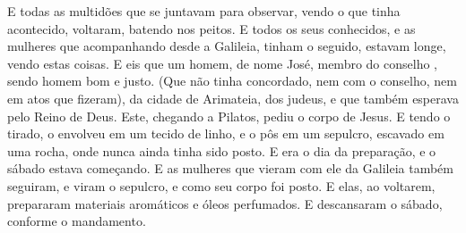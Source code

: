{  E todas as multidões que se juntavam para observar, vendo o que tinha acontecido, voltaram, batendo nos peitos.
  E todos os seus conhecidos, e as mulheres que acompanhando
{} desde a Galileia, tinham o seguido, estavam longe, vendo estas coisas.
  E eis que um homem, de nome José, membro do conselho
{}, sendo homem bom e justo.
  (Que não tinha concordado, nem com o conselho, nem em atos que fizeram), da cidade de Arimateia,
{} dos judeus, e que também esperava pelo Reino de Deus.
  Este, chegando a Pilatos, pediu o corpo de Jesus.
  E tendo o tirado, o envolveu em um tecido de linho, e o pôs em um sepulcro, escavado em uma rocha, onde nunca ainda tinha sido posto.
  E era o dia da preparação, e o sábado estava começando.
  E as mulheres que vieram com ele da Galileia também
{} seguiram, e viram o sepulcro, e como seu corpo foi posto.
  E elas, ao voltarem, prepararam materiais aromáticos e óleos perfumados. E descansaram o sábado, conforme o mandamento.
\par }

